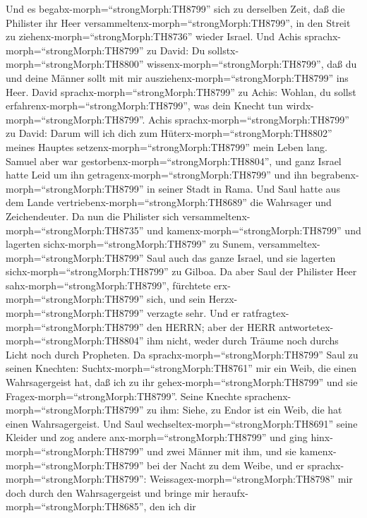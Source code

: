  Und es begabx-morph=``strongMorph:TH8799'' sich zu
derselben Zeit, daß die Philister ihr Heer
versammeltenx-morph=``strongMorph:TH8799'', in den Streit zu
ziehenx-morph=``strongMorph:TH8736'' wieder Israel. Und Achis
sprachx-morph=``strongMorph:TH8799'' zu David: Du
sollstx-morph=``strongMorph:TH8800''
wissenx-morph=``strongMorph:TH8799'', daß du und deine Männer sollt mit
mir ausziehenx-morph=``strongMorph:TH8799'' ins Heer.  David
sprachx-morph=``strongMorph:TH8799'' zu Achis: Wohlan, du sollst
erfahrenx-morph=``strongMorph:TH8799'', was dein Knecht tun
wirdx-morph=``strongMorph:TH8799''. Achis
sprachx-morph=``strongMorph:TH8799'' zu David: Darum will ich dich zum
Hüterx-morph=``strongMorph:TH8802'' meines Hauptes
setzenx-morph=``strongMorph:TH8799'' mein Leben lang. 
Samuel aber war gestorbenx-morph=``strongMorph:TH8804'', und ganz Israel
hatte Leid um ihn getragenx-morph=``strongMorph:TH8799'' und ihn
begrabenx-morph=``strongMorph:TH8799'' in seiner Stadt in Rama. Und Saul
hatte aus dem Lande vertriebenx-morph=``strongMorph:TH8689'' die
Wahrsager und Zeichendeuter.  Da nun die Philister sich
versammeltenx-morph=``strongMorph:TH8735'' und
kamenx-morph=``strongMorph:TH8799'' und lagerten
sichx-morph=``strongMorph:TH8799'' zu Sunem,
versammeltex-morph=``strongMorph:TH8799'' Saul auch das ganze Israel,
und sie lagerten sichx-morph=``strongMorph:TH8799'' zu Gilboa.
 Da aber Saul der Philister Heer
sahx-morph=``strongMorph:TH8799'', fürchtete
erx-morph=``strongMorph:TH8799'' sich, und sein
Herzx-morph=``strongMorph:TH8799'' verzagte sehr.  Und er
ratfragtex-morph=``strongMorph:TH8799'' den HERRN; aber der HERR
antwortetex-morph=``strongMorph:TH8804'' ihm nicht, weder durch Träume
noch durchs Licht noch durch Propheten.  Da
sprachx-morph=``strongMorph:TH8799'' Saul zu seinen Knechten:
Suchtx-morph=``strongMorph:TH8761'' mir ein Weib, die einen
Wahrsagergeist hat, daß ich zu ihr gehex-morph=``strongMorph:TH8799''
und sie Fragex-morph=``strongMorph:TH8799''. Seine Knechte
sprachenx-morph=``strongMorph:TH8799'' zu ihm: Siehe, zu Endor ist ein
Weib, die hat einen Wahrsagergeist.  Und Saul
wechseltex-morph=``strongMorph:TH8691'' seine Kleider und zog andere
anx-morph=``strongMorph:TH8799'' und ging
hinx-morph=``strongMorph:TH8799'' und zwei Männer mit ihm, und sie
kamenx-morph=``strongMorph:TH8799'' bei der Nacht zu dem Weibe, und er
sprachx-morph=``strongMorph:TH8799'':
Weissagex-morph=``strongMorph:TH8798'' mir doch durch den Wahrsagergeist
und bringe mir heraufx-morph=``strongMorph:TH8685'', den ich dir
